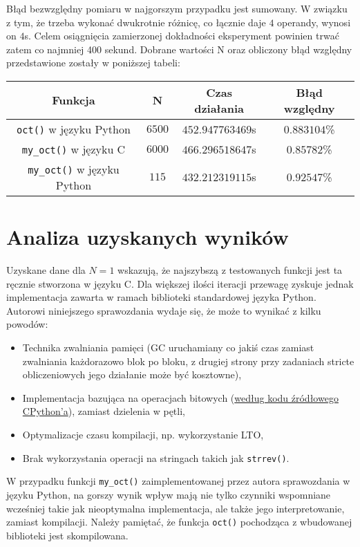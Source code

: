 \documentclass[11pt]{article}
\begin{document}
		Błąd bezwzględny pomiaru w najgorszym przypadku jest sumowany. W związku z tym, że trzeba wykonać dwukrotnie różnicę, co łącznie daje $4$ operandy, wynosi on $4$s.
		Celem osiągnięcia zamierzonej dokładności eksperyment powinien trwać zatem co najmniej 400 sekund. Dobrane wartości N oraz obliczony błąd względny przedstawione zostały w poniższej tabeli:
		
		\begin{table}[!h]
			\begin{tabular}{|c|c|c|c|}
				\hline
				\textbf{Funkcja} & \textbf{N} & \textbf{Czas działania} & \textbf{Błąd względny} \\
				\hline
				\texttt{oct()} w języku Python & $6500$ & $452.947763469$s & $0.883104$\% \\
				\hline
				\texttt{my\_oct()} w języku C & $6000$ & $466.296518647$s & $0.85782$\% \\
				\hline
				\texttt{my\_oct()} w języku Python & $115$ & $432.212319115$s & $0.92547$\% \\
				\hline
			\end{tabular}
		\end{table}
	
	\section{Analiza uzyskanych wyników}
	\justify
	Uzyskane dane dla $N=1$ wskazują, że najszybszą z testowanych funkcji jest ta ręcznie stworzona w języku C.
	Dla większej ilości iteracji przewagę zyskuje jednak implementacja zawarta w ramach biblioteki standardowej języka Python.
	Autorowi niniejszego sprawozdania wydaje się, że może to wynikać z kilku powodów:
	\begin{itemize}
		\item Technika zwalniania pamięci (GC uruchamiany co jakiś czas zamiast zwalniania każdorazowo blok po bloku,
		z drugiej strony przy zadaniach stricte obliczeniowych jego działanie może być kosztowne),
		\item Implementacja bazująca na operacjach bitowych (\href{https://github.com/python/cpython/tree/main}{według kodu źródłowego CPython'a}), zamiast dzielenia w pętli,
		\item Optymalizacje czasu kompilacji, np. wykorzystanie LTO,
		\item Brak wykorzystania operacji na stringach takich jak \texttt{strrev()}.
	\end{itemize}
	\justify
	W przypadku funkcji \texttt{my\_oct()} zaimplementowanej przez autora sprawozdania w języku Python, na gorszy wynik wpływ
	mają nie tylko czynniki wspomniane wcześniej takie jak nieoptymalna implementacja, ale także jego interpretowanie, zamiast kompilacji.
	Należy pamiętać, że funkcja \texttt{oct()} pochodząca z wbudowanej biblioteki jest skompilowana.
\end{document}
